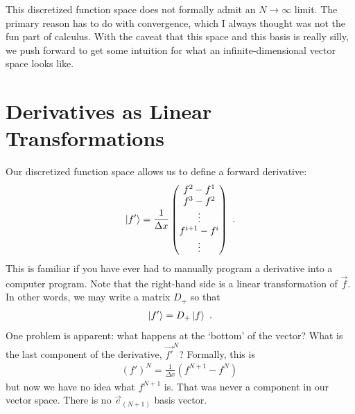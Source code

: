

This discretized function space does not formally admit an $N\to \infty$ limit. The primary reason has to do with convergence, which I always thought was not the fun part of calculus. With the caveat that this space and this basis is really silly, we push forward to get some intuition for what an infinite-dimensional vector space looks like. 


\section{Derivatives as Linear Transformations}

Our discretized function space allows us to define a forward derivative:
\begin{align}
  \left|f'\right\rangle =
  \frac{1}{\Delta x}
  \begin{pmatrix}
    f^2 - f^1 \\
    f^3 - f^2 \\
    \vdots
    \\
    f^{i+1}-f^i
    \\
    \vdots
  \end{pmatrix} \ .
\end{align}
This is familiar if you have ever had to manually program a derivative into a computer program. Note that the right-hand side is a linear transformation of $\vec{f}$. In other words, we may write a matrix $D_+$ so that
\begin{align}
  \left|f'\right\rangle = D_+\left|f\right\rangle \ .
\end{align}
One problem is apparent: what happens at the `bottom’ of the vector? What is the last component of the derivative, $\vec{f'}^N$? Formally, this is
\begin{align}
  {(f')}^N = \frac{1}{\Delta x}(f^{N+1} - f^N) \,
\end{align}
but now we have no idea what $f^{N+1}$ is. That was never a component in our vector space. There is no $\vec{e}_{(N+1)}$ basis vector. 


